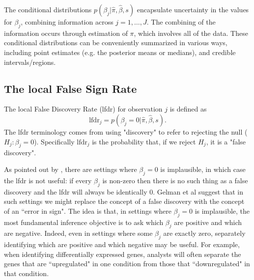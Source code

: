 \documentclass[10pt]{article}
\def\lfdr{\text{lfdr}}
\begin{document}

The conditional distributions $p(\beta_j | \hat\pi, \hat\beta, s)$ 
encapsulate uncertainty in the values for $\beta_j$, combining information across
$j=1,\dots,J$. The combining of the information occurs through estimation of
$\pi$, which involves all of the data.
These conditional distributions can be conveniently summarized
in various ways, including point estimates (e.g. the posterior means or medians),
and credible intervals/regions.



\subsection*{The local False Sign Rate}

The local False Discovery Rate (lfdr) for observation $j$ is defined \cite{efron} as
\begin{equation}
\lfdr_j = p(\beta_j = 0 | \hat\pi, \hat\beta, s).
\end{equation}
The lfdr terminology comes from using "discovery" to refer to rejecting the null ($H_j:\beta_j=0$).
Specifically $\lfdr_j$ is the probability that, if we reject $H_j$,
it is a  "false discovery".  

As pointed out by \cite{gelman.etal}, there are settings where
$\beta_j=0$ is implausible, in which case the lfdr is not useful: if every $\beta_j$ is non-zero then there
is no such thing as a false discovery and the lfdr will always be identically 0. 
Gelman et al suggest that in such settings we
might replace the concept of a false discovery with the
concept of an ``error in sign". The idea is that, in settings where $\beta_j=0$ is implausible, the most fundamental
inference objective is to ask which $\beta_j$ are positive and which are negative. Indeed, even in settings where some
$\beta_j$ are exactly zero, separately identifying which are positive and which negative may be useful. For example, when identifying differentially expressed genes,
analysts will often separate the genes that are ``upregulated" in one condition from those that ``downregulated" in that condition.
\end{document}
